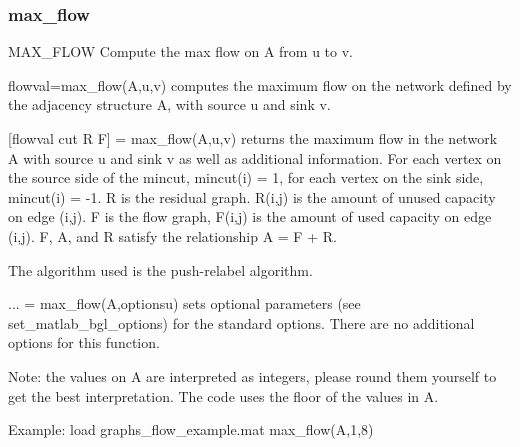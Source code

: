 \subsubsection*{max\_flow}
\begin{mcode}
  MAX_FLOW Compute the max flow on A from u to v.
 
  flowval=max_flow(A,u,v) computes the maximum flow on the network defined by
  the adjacency structure A, with source u and sink v.
 
  [flowval cut R F] = max_flow(A,u,v) returns the maximum flow in the 
  network A with source u and sink v as well as additional information.  
  For each vertex on the source side of the mincut, mincut(i) = 1, 
  for each vertex on the sink side, mincut(i) = -1.  
  R is the residual graph.  R(i,j) is the amount of unused capacity 
  on edge (i,j).  F is the flow graph, F(i,j) is the amount of used 
  capacity on edge (i,j).  F, A, and R satisfy the relationship A = F + R.
 
  The algorithm used is the push-relabel algorithm.
 
  ... = max_flow(A,optionsu) sets optional parameters (see 
  set_matlab_bgl_options) for the standard options.
    There are no additional options for this function.
 
  Note: the values on A are interpreted as integers, please round them
  yourself to get the best interpretation.  The code uses the floor of 
  the values in A.
 
  Example:
     load graphs\max_flow_example.mat
     max_flow(A,1,8)
\end{mcode}
